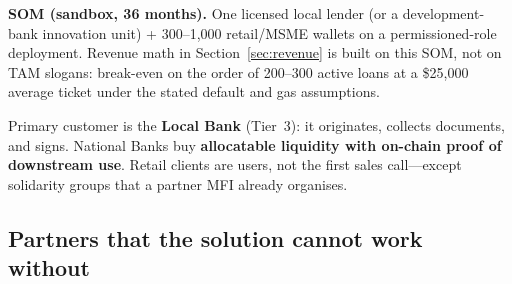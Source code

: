 \documentclass[11pt,a4paper]{article}
\begin{document}
\textbf{SOM (sandbox, 36 months).} One licensed local lender (or a development-bank innovation unit) + 300--1{,}000 retail/MSME wallets on a permissioned-role deployment. Revenue math in Section~\ref{sec:revenue} is built on this SOM, not on TAM slogans: break-even on the order of 200--300 active loans at a \$25{,}000 average ticket under the stated default and gas assumptions.

Primary customer is the \textbf{Local Bank} (Tier~3): it originates, collects documents, and signs. National Banks buy \textbf{allocatable liquidity with on-chain proof of downstream use}. Retail clients are users, not the first sales call---except solidarity groups that a partner MFI already organises.

\subsection{Partners that the solution cannot work without}
\end{document}
